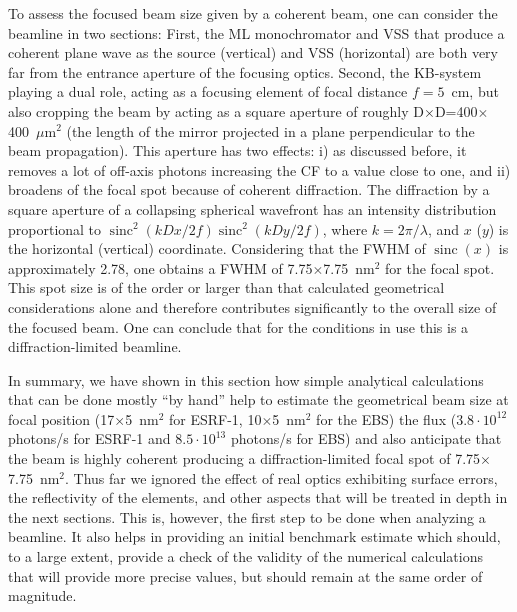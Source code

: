 \documentclass{iucr}              %
\newcommand{\todo}[1]{{\color{red}[TODO: "#1'']}}
\DeclareMathOperator{\sinc}{sinc}
\begin{document}
To assess the focused beam size given by a coherent beam, one can consider the beamline in two sections: First, the ML monochromator and VSS that produce a coherent plane wave as the source (vertical) and VSS (horizontal) are both very far from the entrance aperture of the focusing optics. Second, the KB-system playing a dual role, acting as a focusing element of focal distance $f=5$~cm, but also cropping the beam by acting as a square aperture of roughly D$\times$D=400$\times$400~$\mu$m$^2$ (the length of the mirror projected in a plane perpendicular to the beam propagation).
This aperture has two effects: i) as discussed before, it removes a lot of off-axis photons increasing the CF to a value close to one, and ii) broadens of the focal spot because of coherent diffraction. The diffraction by a square aperture of a collapsing spherical wavefront has an intensity distribution proportional to $\sinc^2(k D x/2 f) \sinc^2(k D y / 2 f)$,
where $k=2\pi/\lambda$, and $x$ ($y$) is the horizontal (vertical) coordinate. Considering that the FWHM of $\sinc(x)$ is approximately 2.78, one obtains a FWHM of 7.75$\times$7.75~nm$^2$ for the focal spot. This spot size is of the order or larger than that calculated geometrical considerations alone and therefore contributes significantly to the overall size of the focused beam. One can conclude that for the conditions in use this is a diffraction-limited beamline. 


In summary, we have shown in this section how simple analytical calculations that can be done mostly ``by hand'' help to estimate the geometrical beam size at focal position (17$\times$5~nm$^2$ for ESRF-1, 10$\times$5~nm$^2$ for the EBS) the flux ($3.8\cdot10^{12}$ photons/s for ESRF-1 and $8.5\cdot10^{13}$ photons/s for EBS) and also anticipate that the beam is highly coherent producing a diffraction-limited focal spot of  7.75$\times$7.75~nm$^2$. Thus far we ignored the effect of real optics exhibiting surface errors, the reflectivity of the elements, and other aspects that will be treated in depth in the next sections. This is, however, the first step to be done when analyzing a beamline. It also helps in providing an initial benchmark estimate which should, to a large extent, provide a check of the validity of the numerical calculations that will provide more precise values, but should remain at the same order of magnitude.  
\end{document}
